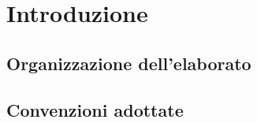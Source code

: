 \mainmatter

\chapter{Introduzione}

\section{Organizzazione dell'elaborato}

\section{Convenzioni adottate}
